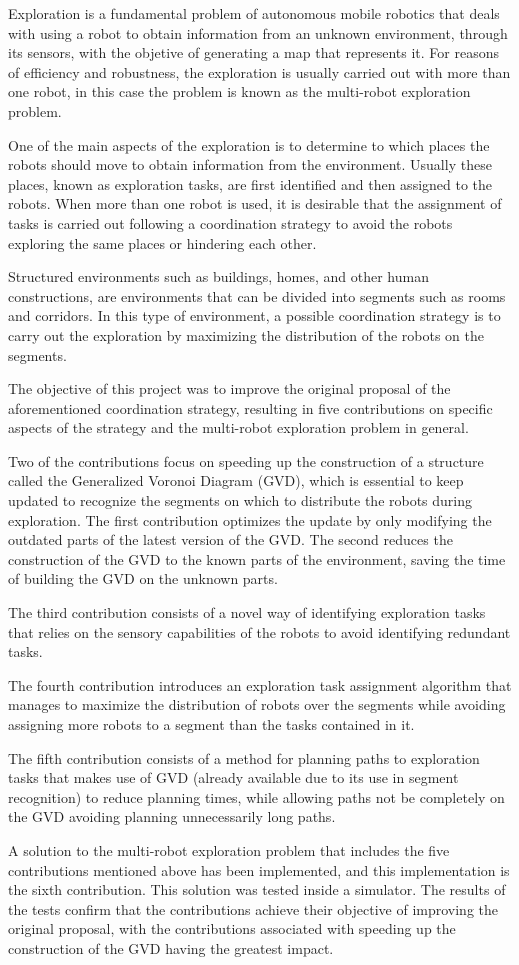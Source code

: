 Exploration is a fundamental problem of autonomous mobile robotics that deals with using a robot to obtain information from an unknown environment, through its sensors, with the objetive of generating a map that represents it. For reasons of efficiency and robustness, the exploration is usually carried out with more than one robot, in this case the problem is known as the multi-robot exploration problem.

One of the main aspects of the exploration is to determine to which places the robots should move to obtain information from the environment. Usually these places, known as exploration tasks, are first identified and then assigned to the robots. When more than one robot is used, it is desirable that the assignment of tasks is carried out following a coordination strategy to avoid the robots exploring the same places or hindering each other.

Structured environments such as buildings, homes, and other human constructions, are environments that can be divided into segments such as rooms and corridors. In this type of environment, a possible coordination strategy is to carry out the exploration by maximizing the distribution of the robots on the segments.

The objective of this project was to improve the original proposal of the aforementioned coordination strategy, resulting in five contributions on specific aspects of the strategy and the multi-robot exploration problem in general.

Two of the contributions focus on speeding up the construction of a structure called the Generalized Voronoi Diagram (GVD), which is essential to keep updated to recognize the segments on which to distribute the robots during exploration. The first contribution optimizes the update by only modifying the outdated parts of the latest version of the GVD. The second reduces the construction of the GVD to the known parts of the environment, saving the time of building the GVD on the unknown parts.

The third contribution consists of a novel way of identifying exploration tasks that relies on the sensory capabilities of the robots to avoid identifying redundant tasks.

The fourth contribution introduces an exploration task assignment algorithm that manages to maximize the distribution of robots over the segments while avoiding assigning more robots to a segment than the tasks contained in it.

The fifth contribution consists of a method for planning paths to exploration tasks that makes use of GVD (already available due to its use in segment recognition) to reduce planning times, while allowing paths not be completely on the GVD avoiding planning unnecessarily long paths.

A solution to the multi-robot exploration problem that includes the five contributions mentioned above has been implemented, and this implementation is the sixth contribution. This solution was tested inside a simulator. The results of the tests confirm that the contributions achieve their objective of improving the original proposal, with the contributions associated with speeding up the construction of the GVD having the greatest impact.
